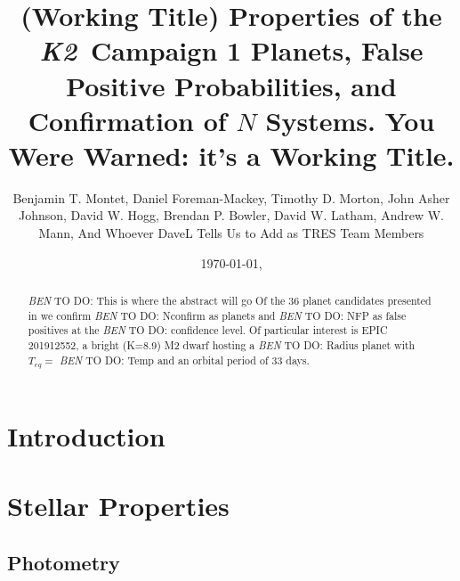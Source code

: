 \documentclass{emulateapj}
\newcommand{\project}[1]{\textsl{#1}}
\newcommand{\KT}{\project{K2}}
\newcommand{\paperit}{\citet{Foreman-Mackey15}}
\newcommand{\todo}[3]{{\color{#2} \emph{#1} TO DO: #3}}
\newcommand{\btmtodo}[1]{\todo{BEN}{red}{#1}}
\begin{document}
\title{(Working Title) Properties of the \KT\ Campaign 1 Planets, 
False Positive Probabilities, and Confirmation of $N$ Systems. You 
Were Warned: it's a Working Title.}

\author{
Benjamin T. Montet, 
Daniel Foreman-Mackey,
Timothy D. Morton,
John Asher Johnson,
David W. Hogg,
Brendan P. Bowler,
David W. Latham,
Andrew W. Mann,
And Whoever DaveL Tells Us to Add as TRES Team Members
}




\date{\today, \currenttime}

\begin{abstract}
\btmtodo{This is where the abstract will go}
Of the 36 planet candidates presented in \paperit{} we confirm 
\btmtodo{Nconfirm} as planets and \btmtodo{NFP} as false positives
at the \btmtodo{confidence} level. Of particular interest is EPIC 201912552, a bright (K=8.9) M2 dwarf
hosting a \btmtodo{Radius} planet with $T_{eq} = $\btmtodo{Temp} and an 
orbital period of 33 days.
\end{abstract}

\keywords{\btmtodo{Keywords}}

\maketitle

\section{Introduction}


\section{Stellar Properties}
\subsection{Photometry}
\end{document}
